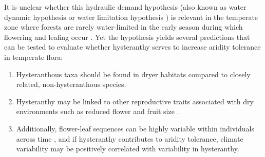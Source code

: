 \documentclass{article}\usepackage[]{graphicx}\usepackage[]{color}
\begin{document}
It is unclear whether this hydraulic demand hypothesis (also known as water dynamic hypothesis \citep{Gougherty2018} or water limitation hypothesis \citep{Buonaiuto2020}) is relevant in the temperate zone where forests are rarely water-limited in the early season during which flowering and leafing occur \citep{Polgar2011}.%
Yet the hypothesis yields several predictions that can be tested to evaluate whether hysteranthy serves to increase aridity tolerance in temperate flora:
\begin{enumerate}
\item Hysteranthous taxa should be found in dryer habitats compared to closely related, non-hysteranthous species.
\item Hysteranthy may be linked to other reproductive traits associated with dry environments such as reduced flower and fruit size \citep{Herrera:2009aa,Liu:2013ua}.
\item Additionally, flower-leaf sequences can be highly variable within individuals across time \citep{Buonaiuto2020}, and if hysteranthy contributes to aridity tolerance, climate variability may be positively correlated with variability in hysteranthy.
\end{enumerate}


\end{document}
